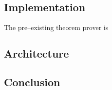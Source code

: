 \documentclass[a4paper, 11pt, oneside]{elsarticle}
\begin{document}
\subsection{Implementation}
The pre--existing theorem prover is %

\subsection{Architecture}

\subsection{Conclusion}



\newpage



\end{document}
